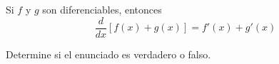 \item Si $f$ y $g$ son diferenciables, entonces 
$$\frac{d}{dx} [f(x) + g(x)] = f'(x) + g'(x)$$
\par
Determine si el enunciado es verdadero o falso.
